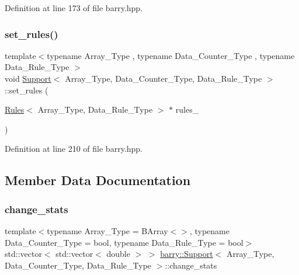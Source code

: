 Definition at line 173 of file barry.\+hpp.

\mbox{\label{classbarry_1_1_support_a66dc1a0e7097d547ea9c84df777ad477}} 
\subsubsection{\texorpdfstring{set\+\_\+rules()}{set\_rules()}}
{\footnotesize\ttfamily template$<$typename Array\+\_\+\+Type , typename Data\+\_\+\+Counter\+\_\+\+Type , typename Data\+\_\+\+Rule\+\_\+\+Type $>$ \\
void \hyperlink{classbarry_1_1_support}{Support}$<$ Array\+\_\+\+Type, Data\+\_\+\+Counter\+\_\+\+Type, Data\+\_\+\+Rule\+\_\+\+Type $>$\+::set\+\_\+rules (\begin{DoxyParamCaption}\item[{\hyperlink{classbarry_1_1_rules}{Rules}$<$ Array\+\_\+\+Type, Data\+\_\+\+Rule\+\_\+\+Type $>$ $\ast$}]{rules\+\_\+ }\end{DoxyParamCaption})\hspace{0.3cm}{\ttfamily [inline]}}



Definition at line 210 of file barry.\+hpp.



\subsection{Member Data Documentation}
\mbox{\label{classbarry_1_1_support_a37c139514065d10807cd574ca748744b}} 
\subsubsection{\texorpdfstring{change\+\_\+stats}{change\_stats}}
{\footnotesize\ttfamily template$<$typename Array\+\_\+\+Type  = B\+Array$<$$>$, typename Data\+\_\+\+Counter\+\_\+\+Type  = bool, typename Data\+\_\+\+Rule\+\_\+\+Type  = bool$>$ \\
std\+::vector$<$ std\+::vector$<$ double $>$ $>$ \hyperlink{classbarry_1_1_support}{barry\+::\+Support}$<$ Array\+\_\+\+Type, Data\+\_\+\+Counter\+\_\+\+Type, Data\+\_\+\+Rule\+\_\+\+Type $>$\+::change\+\_\+stats}



